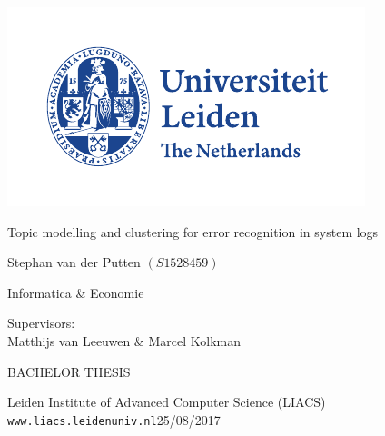 \thispagestyle{empty}

\includegraphics{logoleiden}


\vspace{-2.5cm}\hfill {}

\vspace{3cm}
\begin{Large}
\hfill Topic modelling and clustering for error recognition in system logs


\vspace*{14mm}

\hfill Stephan van der Putten $(S1528459)$ 
\begin{flushright} Informatica \& Economie \end{flushright}
\end{Large}


\begin{large}

\vspace{2.8cm}
Supervisors:\\
Matthijs van Leeuwen \& Marcel Kolkman


\vspace*{2.8cm}

BACHELOR THESIS

\vspace*{5mm}
Leiden Institute of Advanced Computer Science (LIACS)\\
\texttt{www.liacs.leidenuniv.nl}\hfill 25/08/2017
\end{large}

